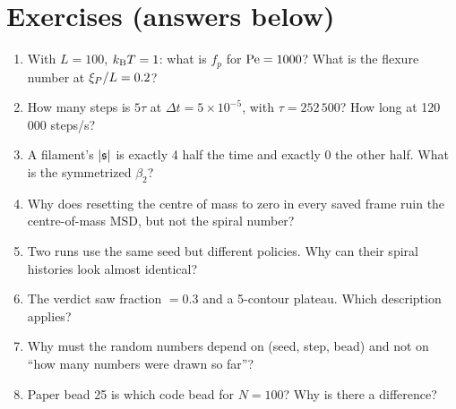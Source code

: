\section{Exercises (answers below)}
\begin{enumerate}
\item With $L=100$, $k_{\mathrm{B}}T=1$: what is $f_p$ for $\mathrm{Pe}=1000$? What is the flexure number at $\xi_{P}/L=0.2$?
\item How many steps is $5\tau$ at $\Delta t=5\times10^{-5}$, with $\tau=252\,500$? How long at 120\,000 steps/s?
\item A filament's $|\mathfrak{s}|$ is exactly 4 half the time and exactly 0 the other half. What is the symmetrized $\beta_2$?
\item Why does resetting the centre of mass to zero in every saved frame ruin the centre-of-mass MSD, but not the spiral number?
\item Two runs use the same seed but different policies. Why can their spiral histories look almost identical?
\item The verdict saw fraction $=0.3$ and a 5-contour plateau. Which description applies?
\item Why must the random numbers depend on (seed, step, bead) and not on ``how many numbers were drawn so far''?
\item Paper bead 25 is which code bead for $N=100$? Why is there a difference?
\end{enumerate}

